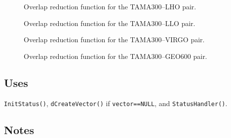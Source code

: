 \documentclass{article}
\begin{document}
%
%
\begin{figure}[htb!]
\begin{center}
{}
\caption{\label{f:TAMA300LHO}
Overlap reduction function for the TAMA300--LHO pair.}
\end{center}
\end{figure}
%
%
\begin{figure}[htb!]
\begin{center}
{}
\caption{\label{f:TAMA300LLO}
Overlap reduction function for the TAMA300--LLO pair.}
\end{center}
\end{figure}
%
%
\begin{figure}[htb!]
\begin{center}
{}
\caption{\label{f:TAMA300VIRGO}
Overlap reduction function for the TAMA300--VIRGO pair.}
\end{center}
\end{figure}
%
%
\begin{figure}[htb!]
\begin{center}
{}
\caption{\label{f:TAMA300GEO600}
Overlap reduction function for the TAMA300--GEO600 pair.}
\end{center}
\end{figure}
%

\subsection{Uses}

{\tt InitStatus()\/}, 
{\tt dCreateVector()\/} if {\tt vector==NULL}, and
{\tt StatusHandler()\/}.

\subsection{Notes}
\end{document}
